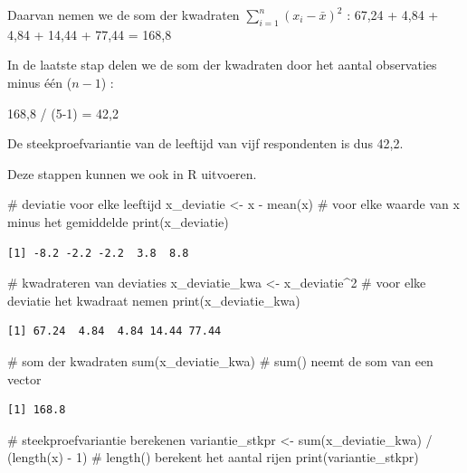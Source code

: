 \documentclass[
  letterpaper,
  DIV=11,
  numbers=noendperiod]{scrreprt}
\newenvironment{Shaded}{\begin{snugshade}}{\end{snugshade}}
\newcommand{\CommentTok}[1]{\textcolor[rgb]{0.37,0.37,0.37}{#1}}
\newcommand{\DecValTok}[1]{\textcolor[rgb]{0.68,0.00,0.00}{#1}}
\newcommand{\FunctionTok}[1]{\textcolor[rgb]{0.28,0.35,0.67}{#1}}
\newcommand{\NormalTok}[1]{\textcolor[rgb]{0.00,0.23,0.31}{#1}}
\newcommand{\OtherTok}[1]{\textcolor[rgb]{0.00,0.23,0.31}{#1}}
\newcommand{\SpecialCharTok}[1]{\textcolor[rgb]{0.37,0.37,0.37}{#1}}
\begin{document}
Daarvan nemen we de som der kwadraten
\(\sum_{i=1}^{n}{(x_i-\bar{x})^2}\) : 67,24 + 4,84 + 4,84 + 14,44 +
77,44 = 168,8

In de laatste stap delen we de som der kwadraten door het aantal
observaties minus één (\(n-1\)) :

168,8 / (5-1) = 42,2

De steekproefvariantie van de leeftijd van vijf respondenten is dus
42,2.

Deze stappen kunnen we ook in R uitvoeren.

\begin{Shaded}
\begin{Highlighting}[]
\CommentTok{\# deviatie voor elke leeftijd}
\NormalTok{x\_deviatie }\OtherTok{\textless{}{-}}\NormalTok{ x }\SpecialCharTok{{-}} \FunctionTok{mean}\NormalTok{(x) }\CommentTok{\# voor elke waarde van x minus het gemiddelde}
\FunctionTok{print}\NormalTok{(x\_deviatie)}
\end{Highlighting}
\end{Shaded}

\begin{verbatim}
[1] -8.2 -2.2 -2.2  3.8  8.8
\end{verbatim}

\begin{Shaded}
\begin{Highlighting}[]
\CommentTok{\# kwadrateren van deviaties}
\NormalTok{x\_deviatie\_kwa }\OtherTok{\textless{}{-}}\NormalTok{ x\_deviatie}\SpecialCharTok{\^{}}\DecValTok{2} \CommentTok{\# voor elke deviatie het kwadraat nemen}
\FunctionTok{print}\NormalTok{(x\_deviatie\_kwa)}
\end{Highlighting}
\end{Shaded}

\begin{verbatim}
[1] 67.24  4.84  4.84 14.44 77.44
\end{verbatim}

\begin{Shaded}
\begin{Highlighting}[]
\CommentTok{\# som der kwadraten}
\FunctionTok{sum}\NormalTok{(x\_deviatie\_kwa) }\CommentTok{\# sum() neemt de som van een vector}
\end{Highlighting}
\end{Shaded}

\begin{verbatim}
[1] 168.8
\end{verbatim}

\begin{Shaded}
\begin{Highlighting}[]
\CommentTok{\# steekproefvariantie berekenen}
\NormalTok{variantie\_stkpr }\OtherTok{\textless{}{-}} \FunctionTok{sum}\NormalTok{(x\_deviatie\_kwa) }\SpecialCharTok{/}\NormalTok{ (}\FunctionTok{length}\NormalTok{(x) }\SpecialCharTok{{-}} \DecValTok{1}\NormalTok{) }\CommentTok{\# length() berekent het aantal rijen}
\FunctionTok{print}\NormalTok{(variantie\_stkpr)}
\end{Highlighting}
\end{Shaded}
\end{document}
